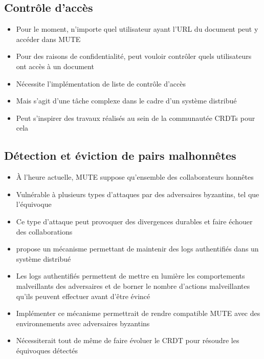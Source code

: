 \documentclass[12pt]{thesul}
\theoremstyle{definition}
\begin{document}
\subsection{Contrôle d'accès}

\begin{itemize}
  \item Pour le moment, n'importe quel utilisateur ayant l'URL du document peut y accéder dans MUTE
  \item Pour des raisons de confidentialité, peut vouloir contrôler quels utilisateurs ont accès à un document
  \item Nécessite l'implémentation de liste de contrôle d'accès
  \item Mais s'agit d'une tâche complexe dans le cadre d'un système distribué
  \item Peut s'inspirer des travaux réalisés au sein de la communautée \acp{CRDT} \cite{2021-access-control-crdts, 2022-dist-access-control-pa} pour cela
\end{itemize}

\subsection{Détection et éviction de pairs malhonnêtes}

\begin{itemize}
  \item À l'heure actuelle, MUTE suppose qu'ensemble des collaborateurs honnêtes
  \item Vulnérable à plusieurs types d'attaques par des adversaires byzantins, tel que l'équivoque
  \item Ce type d'attaque peut provoquer des divergences durables et faire échouer des collaborations
  \item \textcite{2021-these-vic} propose un mécanisme permettant de maintenir des logs authentifiés dans un système distribué
  \item Les logs authentifiés permettent de mettre en lumière les comportements malveillants des adversaires et de borner le nombre d'actions malveillantes qu'ils peuvent effectuer avant d'être évincé
  \item Implémenter ce mécanisme permettrait de rendre compatible MUTE avec des environnements avec adversaires byzantins
  \item Nécessiterait tout de même de faire évoluer le \ac{CRDT} pour résoudre les équivoques détectés
\end{itemize}
\end{document}
